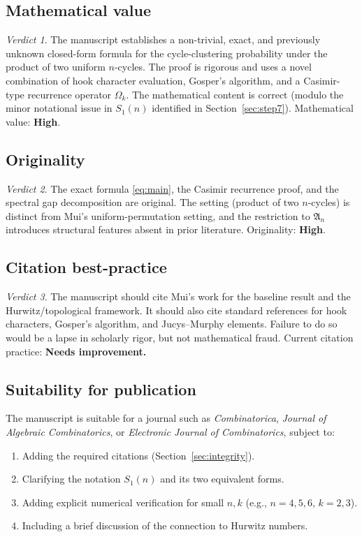 \documentclass[12pt, a4paper]{amsart}
\theoremstyle{plain}
\theoremstyle{definition}
\theoremstyle{remark}
\newtheorem*{verdict}{Verdict}
\newcommand{\An}{\mathfrak{A}_n}
\begin{document}
\subsection{Mathematical value}

\begin{verdict}
The manuscript establishes a non-trivial, exact, and previously unknown closed-form
formula for the cycle-clustering probability under the product of two uniform $n$-cycles.
The proof is rigorous and uses a novel combination of hook character evaluation,
Gosper's algorithm, and a Casimir-type recurrence operator $\Omega_k$.  The mathematical
content is correct (modulo the minor notational issue in $S_1(n)$ identified in
Section~\ref{sec:step7}).  Mathematical value: \textbf{High}.
\end{verdict}

\subsection{Originality}

\begin{verdict}
The exact formula \eqref{eq:main}, the Casimir recurrence proof, and the spectral
gap decomposition are original.  The setting (product of two $n$-cycles) is
distinct from Mui's uniform-permutation setting, and the restriction to $\An$
introduces structural features absent in prior literature.  Originality: \textbf{High}.
\end{verdict}

\subsection{Citation best-practice}

\begin{verdict}
The manuscript should cite Mui's work \cite{mui1,mui2} for the baseline result and
the Hurwitz/topological framework.  It should also cite standard references for
hook characters, Gosper's algorithm, and Jucys--Murphy elements.  Failure to
do so would be a lapse in scholarly rigor, but not mathematical fraud.
Current citation practice: \textbf{Needs improvement.}
\end{verdict}

\subsection{Suitability for publication}

The manuscript is suitable for a journal such as \emph{Combinatorica},
\emph{Journal of Algebraic Combinatorics}, or \emph{Electronic Journal of
Combinatorics}, subject to:
\begin{enumerate}
  \item Adding the required citations (Section~\ref{sec:integrity}).
  \item Clarifying the notation $S_1(n)$ and its two equivalent forms.
  \item Adding explicit numerical verification for small $n,k$ (e.g., $n=4,5,6$,
        $k=2,3$).
  \item Including a brief discussion of the connection to Hurwitz numbers.
\end{enumerate}
\end{document}
